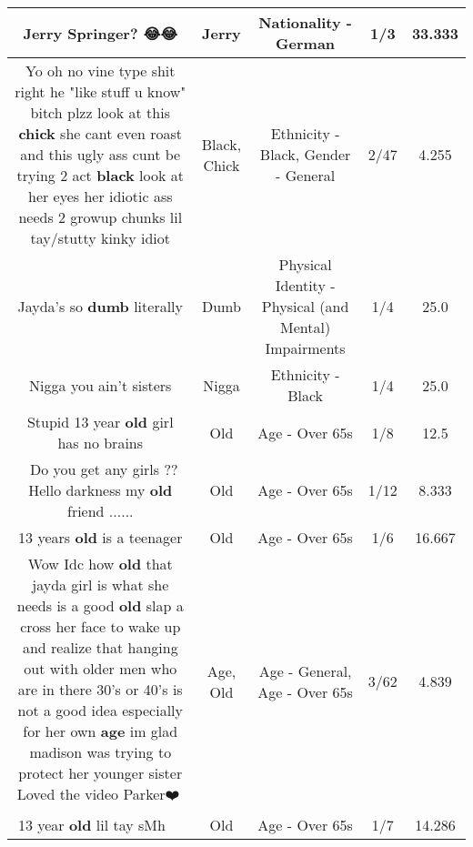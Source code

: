 \documentclass[11pt]{article}
\newlength\mylength
\begin{document}
\begin{center}
\begin{longtable}{|C{.65\mylength}|C{.30\mylength}|C{.12\mylength}|C{.12\mylength}|C{.12\mylength}|}
  \small Jerry Springer? 😂😂\normalsize   & Jerry & Nationality - German & 1/3 & 33.333 \\  \hline
  \small Yo oh no vine type shit right he "like stuff u know" bitch plzz look at this \textbf{chick} she cant even roast and this ugly ass cunt be trying 2 act \textbf{black} look at her eyes her idiotic ass needs 2 growup chunks lil tay/stutty kinky idiot\normalsize   & Black, Chick & Ethnicity - Black, Gender - General & 2/47 & 4.255 \\  \hline
  \small Jayda's so \textbf{dumb} literally\normalsize   & Dumb & Physical Identity - Physical (and Mental) Impairments & 1/4 & 25.0 \\  \hline
  \small Nigga you ain't sisters\normalsize   & Nigga & Ethnicity - Black & 1/4 & 25.0 \\  \hline
  \small Stupid 13 year \textbf{old} girl has no brains\normalsize   & Old & Age - Over 65s & 1/8 & 12.5 \\  \hline
  \small ~Do you get any girls ??Hello darkness my \textbf{old} friend ......\normalsize   & Old & Age - Over 65s & 1/12 & 8.333 \\  \hline
  \small 13 years \textbf{old} is a teenager\normalsize   & Old & Age - Over 65s & 1/6 & 16.667 \\  \hline
  \small Wow Idc how \textbf{old} that jayda girl is what she needs is a good \textbf{old} slap a cross her face to wake up and realize that hanging out with older men who are in there 30's or 40's is not a good idea especially for her own \textbf{age} im glad madison was trying to protect her younger sister Loved the video Parker❤️🙌\normalsize   & Age, Old & Age - General, Age - Over 65s & 3/62 & 4.839 \\  \hline
  \small 13 year \textbf{old} lil tay sMh 🤦🏻‍♀️\normalsize   & Old & Age - Over 65s & 1/7 & 14.286 \\  \hline

\end{longtable}
\end{center}
\end{document}
